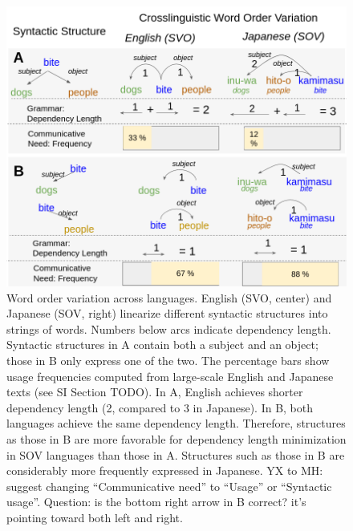 \documentclass[9pt,twocolumn,twoside,lineno]{pnas-new}
\begin{document}
\begin{figure}[ht!]
    \centering
	\includegraphics[width=.8\textwidth]{introductory-figure.png}
\caption{
Word order variation across languages.
English (SVO, center) and Japanese (SOV, right) linearize different syntactic structures into strings of words.
Numbers below arcs indicate dependency length.
Syntactic structures in A contain both a subject and an object; those in B only express one of the two.
	The percentage bars show usage frequencies computed from large-scale English and Japanese texts {\color{blue}(see SI Section TODO)}.
In A, English achieves shorter dependency length (2, compared to 3 in Japanese).
In B, both languages achieve the same dependency length.
Therefore, structures as those in B are more favorable for dependency length minimization in SOV languages than those in A.
Structures such as those in B are considerably more frequently expressed in Japanese. {\color{blue}YX to MH: suggest changing ``Communicative need'' to ``Usage'' or ``Syntactic usage''. Question: is the bottom right arrow in B correct? it's pointing toward both left and right.}
}
        \label{fig:sent-dep}
\end{figure}
\end{document}
